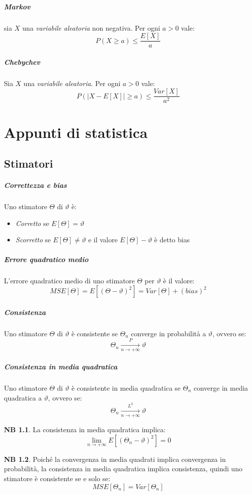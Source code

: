 \documentclass[12pt, a4paper]{report}
\theoremstyle{definition}
\newtheorem*{note}{NB}
\begin{document}
\paragraph{Markov}
sia $X$ una \emph{variabile aleatoria} non negativa. Per ogni $a>0$ vale:
\[P(X\geq a)\leq\frac{E[X]}{a}\]
\paragraph{Chebychev}
Sia $X$ una \emph{variabile aleatoria}. Per ogni $a>0$ vale:
\[P(|X-E[X]|\geq a)\leq \frac{Var[X]}{a^2}\]

\chapter{Appunti di statistica}
\section{Stimatori}
\paragraph{Correttezza e bias}
Uno stimatore $\Theta$ di $\vartheta$ è:
\begin{itemize}
    \item \emph{Corretto} se $E[\Theta]=\vartheta$
    \item \emph{Scorretto} se $E[\Theta]\neq\vartheta$ e il valore $E[\Theta]-
    \vartheta$ è detto bias
\end{itemize}
\paragraph{Errore quadratico medio}
L'errore quadratico medio di uno stimatore $\Theta$ per $\vartheta$ è il valore:
\[MSE[\Theta]=E[(\Theta-\vartheta)^2]=Var[\Theta]+(bias)^2\]

\paragraph{Consistenza}
Uno stimatore $\Theta$ di $\vartheta$ è consistente se $\Theta_n$ converge in
probabilità a $\vartheta$, ovvero se:
\[\Theta_n\xrightarrow[n\to+\infty]{P}\vartheta\]
\paragraph{Consistenza in media quadratica}
Uno stimatore $\Theta$ di $\vartheta$ è consistente in media quadratica se
$\Theta_n$ converge in media quadratica a $\vartheta$, ovvero se:
\[\Theta_n\xrightarrow[n\to+\infty]{L^2}\vartheta\]
\begin{note}
    La consistenza in media quadratica implica:
    \[\lim_{n\to+\infty}E[(\Theta_n-\vartheta)^2]=0\]
\end{note}
\begin{note}
    Poiché la convergenza in media quadrati implica convergenza in probabilità,
    la consistenza in media quadratica implica consistenza, quindi uno stimatore
    è consistente se e solo se:
    \[MSE[\Theta_n]=Var[\Theta_n]\]
\end{note}
\end{document}
